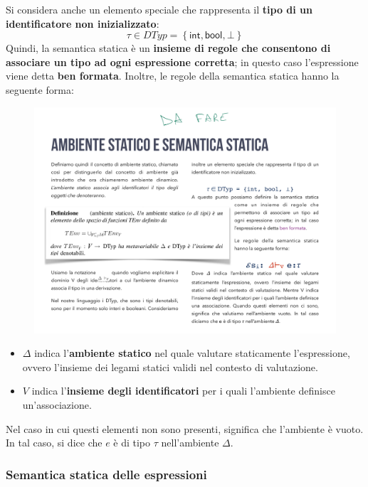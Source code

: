 \documentclass[a4paper]{article}
\begin{document}
	\noindent
	Si considera anche un elemento speciale che rappresenta il \textbf{tipo di un identificatore non inizializzato}:
	\begin{equation*}
		\tau \in DTyp = \left\{\textsf{int}, \textsf{bool}, \bot\right\}
	\end{equation*}
	Quindi, la semantica statica è un \textbf{insieme di regole che consentono di associare un tipo ad ogni espressione corretta}; in questo caso l'espressione viene detta \textcolor{Red3}{\textbf{ben formata}}. Inoltre, le regole della semantica statica hanno la seguente forma:\label{ben formata}
	\begin{figure}[!htp]
		\centering
		\includegraphics[width=.3\textwidth]{img/semantica_statica.pdf}
	\end{figure}
	
	\noindent
	\begin{itemize}
		\item $\Delta$ indica l'\textbf{ambiente statico} nel quale valutare staticamente l'espressione, ovvero l'insieme dei legami statici validi nel contesto di valutazione.
		
		\item $V$ indica l'\textbf{insieme degli identificatori} per i quali l'ambiente definisce un'associazione.
	\end{itemize}
	Nel caso in cui questi elementi non sono presenti, significa che l'ambiente è vuoto. In tal caso, si dice che $e$ è di tipo $\tau$ nell'ambiente $\Delta$.\newpage

	\subsubsection{Semantica statica delle espressioni}\label{semantica statica delle espressioni}
	
\end{document}
